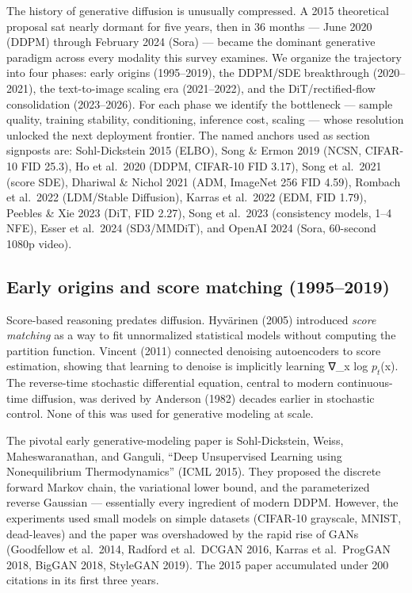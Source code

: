 The history of generative diffusion is unusually compressed. A 2015 theoretical proposal sat nearly dormant for five years, then in 36 months --- June 2020 (DDPM) through February 2024 (Sora) --- became the dominant generative paradigm across every modality this survey examines. We organize the trajectory into four phases: early origins (1995--2019), the DDPM/SDE breakthrough (2020--2021), the text-to-image scaling era (2021--2022), and the DiT/rectified-flow consolidation (2023--2026). For each phase we identify the bottleneck --- sample quality, training stability, conditioning, inference cost, scaling --- whose resolution unlocked the next deployment frontier. The named anchors used as section signposts are: Sohl-Dickstein 2015 (ELBO), Song \& Ermon 2019 (NCSN, CIFAR-10 FID 25.3), Ho et al.~2020 (DDPM, CIFAR-10 FID 3.17), Song et al.~2021 (score SDE), Dhariwal \& Nichol 2021 (ADM, ImageNet 256 FID 4.59), Rombach et al.~2022 (LDM/Stable Diffusion), Karras et al.~2022 (EDM, FID 1.79), Peebles \& Xie 2023 (DiT, FID 2.27), Song et al.~2023 (consistency models, 1--4 NFE), Esser et al.~2024 (SD3/MMDiT), and OpenAI 2024 (Sora, 60-second 1080p video).

\subsection{Early origins and score matching (1995--2019)}\label{early-origins-and-score-matching-19952019}

Score-based reasoning predates diffusion. Hyvärinen (2005) introduced \emph{score matching} as a way to fit unnormalized statistical models without computing the partition function. Vincent (2011) connected denoising autoencoders to score estimation, showing that learning to denoise is implicitly learning ∇\_x log \(p_t\)(x). The reverse-time stochastic differential equation, central to modern continuous-time diffusion, was derived by Anderson (1982) decades earlier in stochastic control. None of this was used for generative modeling at scale.

The pivotal early generative-modeling paper is Sohl-Dickstein, Weiss, Maheswaranathan, and Ganguli, ``Deep Unsupervised Learning using Nonequilibrium Thermodynamics'' (ICML 2015). They proposed the discrete forward Markov chain, the variational lower bound, and the parameterized reverse Gaussian --- essentially every ingredient of modern DDPM. However, the experiments used small models on simple datasets (CIFAR-10 grayscale, MNIST, dead-leaves) and the paper was overshadowed by the rapid rise of GANs (Goodfellow et al.~2014, Radford et al.~DCGAN 2016, Karras et al.~ProgGAN 2018, BigGAN 2018, StyleGAN 2019). The 2015 paper accumulated under 200 citations in its first three years.

